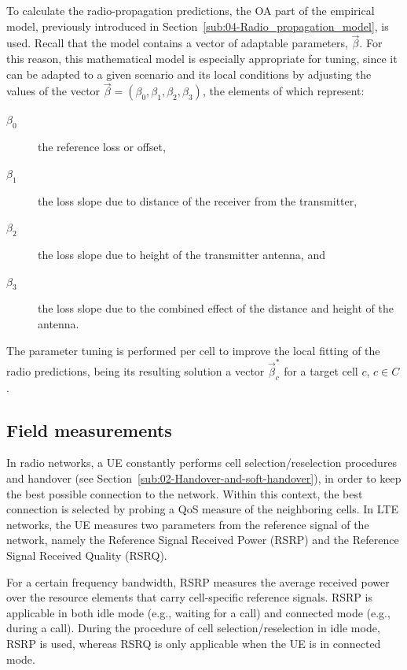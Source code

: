 To calculate the radio-propagation predictions, the OA part of the
empirical model, previously introduced in Section~\ref{sub:04-Radio_propagation_model},
is used. Recall that the model contains a vector of adaptable parameters,
$\vec{\beta}$. For this reason, this mathematical model is especially
appropriate for tuning, since it can be adapted to a given scenario
and its local conditions by adjusting the values of the vector $\vec{\beta}=(\beta_{0},\beta_{1},\beta_{2},\beta_{3})$,
the elements of which represent:
\begin{description}
\item [{$\beta_{0}$}] the reference loss or offset,
\item [{$\beta_{1}$}] the loss slope due to distance of the receiver from
the transmitter,
\item [{$\beta_{2}$}] the loss slope due to height of the transmitter
antenna, and
\item [{$\beta_{3}$}] the loss slope due to the combined effect of the
distance and height of the antenna.
\end{description}
The parameter tuning is performed per cell to improve the local fitting
of the radio predictions, being its resulting solution a vector $\vec{\beta}_{c}^{*}$
for a target cell $c$, $c\in C$.


\subsection{Field measurements \label{sub:05-Field_measurements}}

In radio networks, a UE constantly performs cell selection/reselection
procedures and handover (see Section~\ref{sub:02-Handover-and-soft-handover}),
in order to keep the best possible connection to the network. Within
this context, the best connection is selected by probing a QoS measure
of the neighboring cells. In LTE networks, the UE measures two parameters
from the reference signal of the network, namely the Reference Signal
Received Power (RSRP)
and the Reference Signal Received Quality (RSRQ).

For a certain frequency bandwidth, RSRP measures the average received
power over the resource elements that carry cell-specific reference
signals. RSRP is applicable in both idle mode (e.g., waiting for a
call) and connected mode (e.g., during a call). During the procedure
of cell selection/reselection in idle mode, RSRP is used, whereas
RSRQ is only applicable when the UE is in connected mode. 

